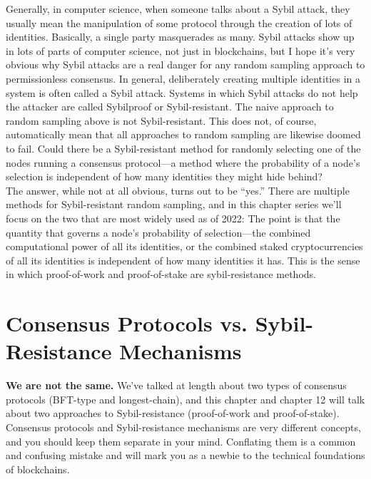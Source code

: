 Generally, in computer science, when someone talks about a Sybil attack, they usually
mean the manipulation of some protocol through the creation of lots of identities. Basically,
a single party masquerades as many. Sybil attacks show up in lots of parts of computer
science, not just in blockchains, but I hope it’s very obvious why Sybil attacks are a real
danger for any random sampling approach to permissionless consensus.
In general, deliberately creating multiple identities in a system is often called a Sybil
attack. Systems in which Sybil attacks do not help the attacker are called Sybilproof or
Sybil-resistant. The naive approach to random sampling above is not Sybil-resistant. This
does not, of course, automatically mean that all approaches to random sampling are likewise
doomed to fail. Could there be a Sybil-resistant method for randomly selecting one of the
nodes running a consensus protocol—a method where the probability of a node’s selection
is independent of how many identities they might hide behind?\\
The answer, while not at all obvious, turns out to be “yes.” There are multiple methods
for Sybil-resistant random sampling, and in this chapter series we’ll focus on the two that are
most widely used as of 2022:
The point is that the quantity that governs a node’s probability of selection—the combined
computational power of all its identities, or the combined staked cryptocurrencies of all its
identities is independent of how many identities it has. This is the sense in which
proof-of-work and proof-of-stake are sybil-resistance methods.

\section{Consensus Protocols vs. Sybil-Resistance Mechanisms}
\noindent
\textbf{We are not the same.} We've talked at length about two types of consensus protocols (BFT-type and longest-chain), and this chapter and chapter 12 will talk about two approaches to
Sybil-resistance (proof-of-work and proof-of-stake). Consensus protocols and Sybil-resistance
mechanisms are very different concepts, and you should keep them separate in your mind.
Conflating them is a common and confusing mistake and will mark you as a newbie to the
technical foundations of blockchains.\\

